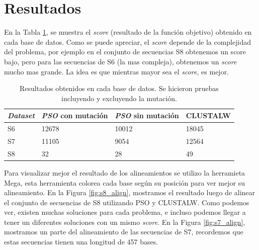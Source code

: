 \documentclass{cup-pan}
\begin{document}
	\section{Resultados}
	
	En la Tabla \ref{tab:result}, se muestra el \textit{score} (resultado de la función objetivo) obtenido en cada base de datos. Como se puede apreciar, el \textit{score} depende de la complejidad del problema, por ejemplo en el conjunto de secuencias S8 obtenemos un score bajo, pero para las secuencias de S6 (la mas compleja), obtenemos un \textit{score} mucho mas grande. La idea es que mientras mayor sea el \textit{score}, es mejor. \\
	
	\begin{table}[h]
		\centering
		\caption{Resultados obtenidos en cada base de datos. Se hicieron pruebas incluyendo y excluyendo la mutación.}
		\begin{tabular}{p{2cm}p{3cm}p{3cm}p{2cm}}
			
			\textbf{\textit{Dataset}} & \textbf{\textit{PSO} con mutación}  & \textbf{\textit{PSO} sin mutación} & \textbf{CLUSTALW} \\
			\hline			
			S6	& 12678	& 10012	& 18045 \\				
			S7 & 11105 & 9054 & 12564 \\
			S8 & 32 & 28 & 49 \\ 				
			\hline 
		\end{tabular}		
		\label{tab:result}
	\end{table}


	Para visualizar mejor el resultado de los alineamientos se utilizo la herramieta Mega, esta herramienta colorea cada base según su posición para ver mejor su alineamiento. En la Figura \ref{fig:s8_align}, mostramos el resultado luego de alinear el conjunto de secuencias de S8 utilizando PSO y CLUSTALW. Como podemos ver, existen muchas soluciones para cada problema, e incluso podemos llegar a tener un diferentes soluciones con un mismo \textit{score}. En la Figura \ref{fig:s7_align}, mostramos un parte del alineamiento de las secuencias de S7, recordemos que estas secuencias tienen una longitud de 457 bases.
	
\end{document}
